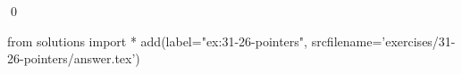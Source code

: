 
\begin{ex}
  \label{ex:31-26-pointers}
  
  \qed
\end{ex}
\begin{python0}
from solutions import *
add(label="ex:31-26-pointers",
    srcfilename='exercises/31-26-pointers/answer.tex')
\end{python0}
